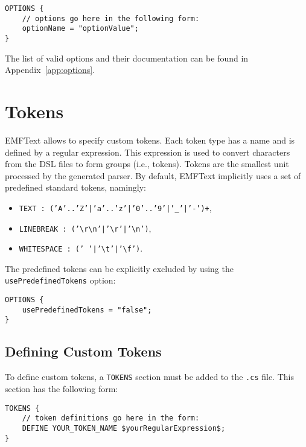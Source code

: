 \lstset{language=CS}
\begin{lstlisting}
OPTIONS {
    // options go here in the following form:
    optionName = "optionValue";
}
\end{lstlisting}

The list of valid options and their documentation can be found in
Appendix~\ref{app:options}.

\section{Tokens}
\label{sec:tokens}

EMFText allows to specify custom tokens. Each token type has a name and is
defined by a regular expression. This expression is used to convert characters 
from the DSL files to form groups (i.e., tokens). Tokens are the smallest unit
processed by the generated parser. By default, EMFText implicitly uses a set of
predefined standard tokens, namingly:

\begin{itemize}
  \item \texttt{TEXT : ('A'..'Z'|'a'..'z'|'0'..'9'|'\_'|'-')+},
  \item \texttt{LINEBREAK :
  ('\textbackslash{}r\textbackslash{}n'|'\textbackslash{}r'|'\textbackslash{}n')},
  \item \texttt{WHITESPACE : (' '|'\textbackslash{}t'|'\textbackslash{}f')}.
\end{itemize}

The predefined tokens can be explicitly excluded by using the 
\texttt{usePredefinedTokens} option:

\lstset{language=CS}
\begin{lstlisting}
OPTIONS {
    usePredefinedTokens = "false";
}
\end{lstlisting}

\subsection{Defining Custom Tokens}

To define custom tokens, a \texttt{TOKENS} section must be added to the
\texttt{.cs} file. This section has the following form:

\lstset{language=CS}
\begin{lstlisting}
TOKENS {
    // token definitions go here in the form:
    DEFINE YOUR_TOKEN_NAME $yourRegularExpression$;
}
\end{lstlisting}

